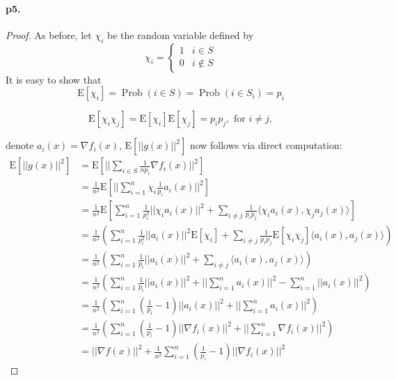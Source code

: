 \documentclass[12pt,a4paper]{article}
\begin{document}
\paragraph{p5.}
\begin{proof}{}
As before, let $\chi_{i}$ be the random variable defined by
	$$
	\chi_{i}= \begin{cases}1 & i \in S \\ 0 & i \notin S\end{cases}
	$$
	It is easy to show that
	$$
	\mathrm{E}\left[\chi_{i}\right]=\operatorname{Prob}(i \in S)=\operatorname{Prob}\left(i \in S_{i}\right)=p_{i}
	$$

	$$
	\mathrm{E}\left[\chi_{i}\chi_j\right]=\mathrm{E}\left[\chi_i\right]\mathrm{E}\left[\chi_j\right]=p_{i}p_{j}, \text{   for } i\neq j,
	$$


denote $a_i(x)=\nabla f_i(x)$, $\mathrm{E}\left[||g(x)||^2\right]$ now follows via direct computation:
	$$
	\begin{aligned}
		\mathrm{E}[||g(x)||^2] & \stackrel{}{=} \mathrm{E}\left[||\sum_{i \in S} \frac{1}{n p_{i}} \nabla f_{i}(x)||^2\right] \\
		&=\frac{1}{n^2}\mathrm{E}\left[||\sum_{i=1}^{n} \chi_{i} \frac{1}{p_i}a_i(x)||^2\right] \\
		&=\frac{1}{n^2}\mathrm{E}\left[\sum_{i =1}^{n}\frac{1}{p_i^2}||\chi_ia_i(x)||^2+\sum_{i\neq j}\frac{1}{p_ip_j}\langle \chi_ia_i(x),\chi_ja_j(x)\rangle\right] \\
		& \stackrel{}{=} \frac{1}{n^2}\left(\sum_{i =1}^{n}\frac{1}{p_i^2}||a_i(x)||^2\mathrm{E}\left[\chi_i\right]+\sum_{i \neq j}\frac{1}{p_ip_j}\mathrm{E}\left[\chi_i\chi_j\right]\langle a_i(x),a_j(x)\rangle \right)\\
		&=\frac{1}{n^2}\left(\sum_{i =1}^n\frac{1}{p_i}||a_i(x)||^2+\sum_{i \neq j}\langle a_i(x),a_j(x)\rangle\right)\\
		&=\frac{1}{n^2}\left(\sum_{i =1}^n\frac{1}{p_i}||a_i(x)||^2+||\sum_{i =1}^na_i(x)||^2-\sum_{i =1}^n||a_i(x)||^2\right)\\
		&=\frac{1}{n^2}\left(\sum_{i =1}^n\left(\frac{1}{p_i}-1\right)||a_i(x)||^2+||\sum_{i =1}^na_i(x)||^2\right)\\
		&=\frac{1}{n^2}\left(\sum_{i =1}^n\left(\frac{1}{p_i}-1\right)||\nabla f_i(x)||^2+||\sum_{i =1}^n\nabla f_i(x)||^2\right)\\
		&=||\nabla f(x)||^2+\frac{1}{n^2}\sum_{i =1}^n\left(\frac{1}{p_i}-1\right)||\nabla f_i(x)||^2
	\end{aligned}
	$$
\end{proof}
\end{document}
